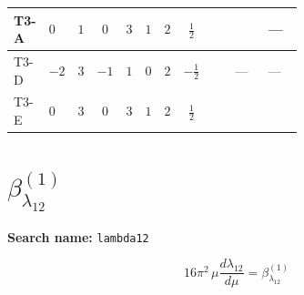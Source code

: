 \documentclass[8pt]{article}
\begin{document}
\begin{landscape}
\begin{longtable}{@{}llcccccc >{\raggedright\arraybackslash}p{0.21\linewidth} >{\raggedright\arraybackslash}p{0.21\linewidth} >{\raggedright\arraybackslash}p{0.21\linewidth}@{}}
\midrule
T3-A & $0$ & $1$ & $0$ & $3$ & $1$ & $2$ & $\frac{1}{2}$ & \scriptsize\adjustbox{max width=\linewidth}{$\begin{gathered} -\frac{15 {g_Y}^2 {\lambda_{H2}}}{2}\end{gathered}$} & \scriptsize\adjustbox{max width=\linewidth}{$\begin{gathered} +6 {\lambda_{H2}^{\rm Adj}}^2\end{gathered}$} & --- \\
\midrule
T3-D & $-2$ & $3$ & $-1$ & $1$ & $0$ & $2$ & $-\frac{1}{2}$ & \scriptsize\adjustbox{max width=\linewidth}{$\begin{gathered} -\frac{3 {g_Y}^2 {\lambda_{H2}}}{2}\end{gathered}$} & --- & --- \\
\midrule
T3-E & $0$ & $3$ & $0$ & $3$ & $1$ & $2$ & $\frac{1}{2}$ & \scriptsize\adjustbox{max width=\linewidth}{$\begin{gathered} -\frac{15 {g_Y}^2 {\lambda_{H2}}}{2}\end{gathered}$} & \scriptsize\adjustbox{max width=\linewidth}{$\begin{gathered} +6 {\lambda_{H2}^{\rm Adj}}^2\end{gathered}$} & \scriptsize\adjustbox{max width=\linewidth}{$\begin{gathered} +{\lambda_{H1}} (6 {\lambda_{12}}+4 {\lambda_{12}^{\rm Cross}})\end{gathered}$} \\
\midrule
\bottomrule
\end{longtable}
\clearpage
\section*{$\beta_{\lambda_{12}}^{(1)}$}
\noindent\textbf{Search name: }\texttt{lambda12}\par\smallskip
\[16\pi^2\,\mu\frac{d \lambda_{12}}{d\mu}=\beta_{\lambda_{12}}^{(1)}\]

\end{landscape}
\end{document}
